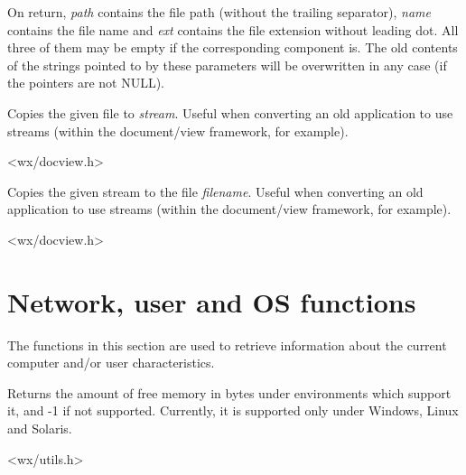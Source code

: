 On return, {\it path} contains the file path (without the trailing separator), {\it name}
contains the file name and {\it ext} contains the file extension without leading dot. All
three of them may be empty if the corresponding component is. The old contents of the
strings pointed to by these parameters will be overwritten in any case (if the pointers
are not NULL).


\label{wxtransferfiletostream}


Copies the given file to {\it stream}. Useful when converting an old application to
use streams (within the document/view framework, for example).


<wx/docview.h>


\label{wxtransferstreamtofile}


Copies the given stream to the file {\it filename}. Useful when converting an old application to
use streams (within the document/view framework, for example).


<wx/docview.h>



\section{Network, user and OS functions}\label{networkfunctions}

The functions in this section are used to retrieve information about the
current computer and/or user characteristics.


\label{wxgetfreememory}


Returns the amount of free memory in bytes under environments which
support it, and -1 if not supported. Currently, it is supported only
under Windows, Linux and Solaris.


<wx/utils.h>


\label{wxgetfullhostname}

